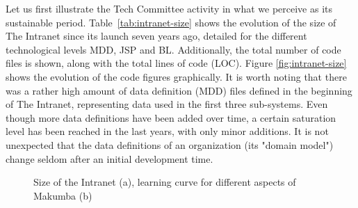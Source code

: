 \documentclass{llncs}
\begin{document}
Let us first illustrate the Tech Committee activity in what we perceive as its sustainable period. Table~\ref{tab:intranet-size} shows the evolution of the size of The Intranet since its launch seven years ago, detailed for the different technological levels MDD, JSP and BL. Additionally, the total number of code files is shown, along with the total lines of code (LOC).  Figure \ref{fig:intranet-size} shows the evolution of the code figures graphically. It is worth noting that there was a rather high amount of data definition (MDD) files defined in the beginning of The Intranet, representing data used in the first three sub-systems. Even though more data definitions have been added over time, a certain saturation level has been reached in the last years, with only minor additions. It is not unexpected that the data definitions of an organization (its "domain model") change seldom after an initial development time. 

\begin{figure}[t]
  	\centering
   \caption{Size of the Intranet (a), learning curve for different aspects of Makumba (b)}
\end{figure} 
\end{document}
